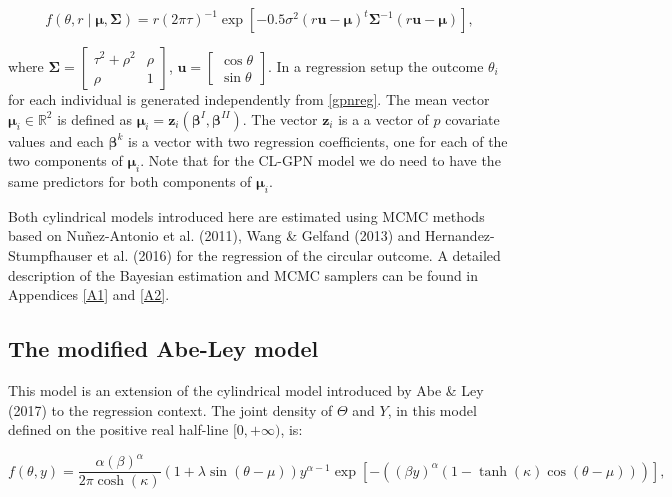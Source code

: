 \documentclass[11pt,]{article}
\begin{document}
\begin{equation}\label{gpnreg}
f(\theta, r \mid \boldsymbol{\mu}, \boldsymbol{\Sigma}) = r(2\pi\tau)^{-1} \exp\left[ -0.5 \sigma^2(r\boldsymbol{u}-\boldsymbol{\mu})^{t}\boldsymbol{\Sigma}^{-1}(r\boldsymbol{u}-\boldsymbol{\mu})\right],
\end{equation}

where
\(\boldsymbol{\Sigma} = \begin{bmatrix} \tau^2 + \rho^2 & \rho\\ \rho & 1 \end{bmatrix}\),
\(\boldsymbol{u}= \begin{bmatrix} \cos \theta \\ \sin \theta \end{bmatrix}\).
In a regression setup the outcome \(\theta_i\) for each individual is
generated independently from \eqref{gpnreg}. The mean vector
\(\boldsymbol{\mu}_i \in \mathbb{R}^2\) is defined as
\(\boldsymbol{\mu}_i = \boldsymbol{z}_i(\boldsymbol{\beta}^{I}, \boldsymbol{\beta}^{II})\).
The vector \(\boldsymbol{z}_i\) is a a vector of \(p\) covariate values
and each \(\boldsymbol{\beta}^{k}\) is a vector with two regression
coefficients, one for each of the two components of
\(\boldsymbol{\mu}_i\). Note that for the CL-GPN model we do need to
have the same predictors for both components of \(\boldsymbol{\mu}_i\).

Both cylindrical models introduced here are estimated using MCMC methods
based on Nuñez-Antonio et al. (2011), Wang \& Gelfand (2013) and
Hernandez-Stumpfhauser et al. (2016) for the regression of the circular
outcome. A detailed description of the Bayesian estimation and MCMC
samplers can be found in Appendices \ref{A1} and \ref{A2}.

\subsection{The modified Abe-Ley model}\label{WeiSSVM}

This model is an extension of the cylindrical model introduced by Abe \&
Ley (2017) to the regression context. The joint density of \(\Theta\)
and \(Y\), in this model defined on the positive real half-line
\([0, + \infty)\), is:

\begin{equation}\label{WeiSSVMdensity}
f(\theta, y) = \frac{\alpha(\beta)^\alpha}{2\pi\cosh(\kappa)}
                 (1 +\lambda\sin(\theta - \mu))
                 y^{\alpha-1}
                 \exp[-((\beta y)^{\alpha}(1-\tanh(\kappa)\cos(\theta - \mu)))],
\end{equation}
\end{document}
